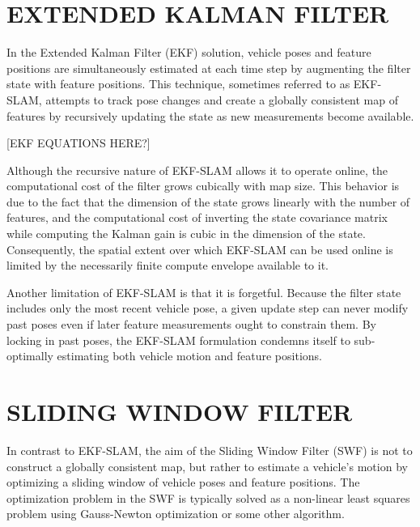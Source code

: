 \documentclass[letterpaper, 10 pt, conference]{ieeeconf}  %
\begin{document}
\section{EXTENDED KALMAN FILTER} \label{sec:ekf}
In the Extended Kalman Filter (EKF) solution, vehicle poses and feature positions are simultaneously estimated at each time step by augmenting the filter state with feature positions.
This technique, sometimes referred to as EKF-SLAM, attempts to track pose changes and create a globally consistent map of features by recursively updating the state as new measurements become available.

[EKF EQUATIONS HERE?]

Although the recursive nature of EKF-SLAM allows it to operate online, the computational cost of the filter grows cubically with map size.
This behavior is due to the fact that the dimension of the state grows linearly with the number of features, and the computational cost of inverting the state covariance matrix while computing the Kalman gain is cubic in the dimension of the state.
Consequently, the spatial extent over which EKF-SLAM can be used online is limited by the necessarily finite compute envelope available to it.

Another limitation of EKF-SLAM is that it is forgetful.
Because the filter state includes only the most recent vehicle pose, a given update step can never modify past poses even if later feature measurements ought to constrain them.
By locking in past poses, the EKF-SLAM formulation condemns itself to sub-optimally estimating both vehicle motion and feature positions.

\section{SLIDING WINDOW FILTER} \label{sec:slidingwindow}
In contrast to EKF-SLAM, the aim of the Sliding Window Filter (SWF) is not to construct a globally consistent map, but rather to estimate a vehicle's motion by optimizing a sliding window of vehicle poses and feature positions.
The optimization problem in the SWF is typically solved as a non-linear least squares problem using Gauss-Newton optimization or some other algorithm.
\end{document}
